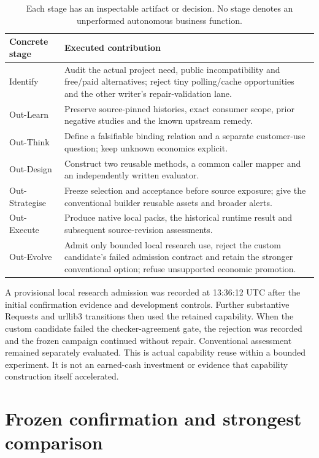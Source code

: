 \documentclass[11pt,letterpaper]{article}
\begin{document}
\begin{table}[H]\small
\begin{tabularx}{\textwidth}{@{}p{1.2in}Y@{}}\toprule
Concrete stage & Executed contribution\\\midrule
Identify & Audit the actual project need, public incompatibility and free/paid alternatives; reject tiny polling/cache opportunities and the other writer's repair-validation lane.\\
Out-Learn & Preserve source-pinned histories, exact consumer scope, prior negative studies and the known upstream remedy.\\
Out-Think & Define a falsifiable binding relation and a separate customer-use question; keep unknown economics explicit.\\
Out-Design & Construct two reusable methods, a common caller mapper and an independently written evaluator.\\
Out-Strategise & Freeze selection and acceptance before source exposure; give the conventional builder reusable assets and broader alerts.\\
Out-Execute & Produce native local packs, the historical runtime result and subsequent source-revision assessments.\\
Out-Evolve & Admit only bounded local research use, reject the custom candidate's failed admission contract and retain the stronger conventional option; refuse unsupported economic promotion.\\\bottomrule
\end{tabularx}
\caption{Each stage has an inspectable artifact or decision. No stage denotes an unperformed autonomous business function.}
\end{table}

A provisional local research admission was recorded at 13:36:12 UTC after the initial confirmation evidence and development controls. Further substantive Requests and urllib3 transitions then used the retained capability. When the custom candidate failed the checker-agreement gate, the rejection was recorded and the frozen campaign continued without repair. Conventional assessment remained separately evaluated. This is actual capability reuse within a bounded experiment. It is not an earned-cash investment or evidence that capability construction itself accelerated.

\section{Frozen confirmation and strongest comparison}
\end{document}
